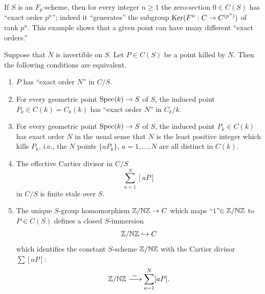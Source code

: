\begin{caution}\label{caution:1.4.3}
If $S$ is an $F_p$-scheme, then for every integer $n \ge 1$ the zero-section $0 \in C(S)$ has ``exact order $p^n$''; indeed it ``generates'' the subgroup $\operatorname{Ker}(F^n : C \to C^{(p^n)})$ of rank $p^n$. This example shows that a given point can have many different ``exact orders.''
\end{caution}

\begin{lemma}\label{lem:1.4.4}
Suppose that $N$ is invertible on $S$. Let $P \in C(S)$ be a point killed by $N$. Then the following conditions are equivalent.
\begin{enumerate}[(1)]
\item $P$ has ``exact order $N$'' in $C/S$.
\item For every geometric point $\operatorname{Spec}(k) \to S$ of $S$, the induced point $P_k \in C(k) = C_k(k)$ has ``exact order $N$'' in $C_k/k$.
\item For every geometric point $\operatorname{Spec}(k) \to S$ of $S$, the induced point $P_k \in C(k)$ has exact order $N$ in the usual sense that $N$ is the least positive integer which kills $P_k$, i.e., the $N$ points $\{aP_k\}$, $a = 1, \ldots, N$ are all distinct in $C(k)$.
\item The effective Cartier divisor in $C/S$
\[
\sum_{a=1}^{N} [aP]
\]
in $C/S$ is finite etale over $S$.
\item The unique $S$-group homomorphism $\mathbb{Z}/\mathbb{N}\mathbb{Z} \to C$ which maps ``$1$''$\in \mathbb{Z}/\mathbb{N}\mathbb{Z}$ to $P \in C(S)$ defines a closed $S$-immersion
\[
\mathbb{Z}/\mathbb{N}\mathbb{Z} \hookrightarrow C
\]
which identifies the constant $S$-scheme $\mathbb{Z}/\mathbb{N}\mathbb{Z}$ with the Cartier divisor $\sum [aP]$:
\[
\mathbb{Z}/\mathbb{N}\mathbb{Z} \xrightarrow{\ \sim\ } \sum_{a=1}^{N} [aP].
\]
\end{enumerate}
\end{lemma}

